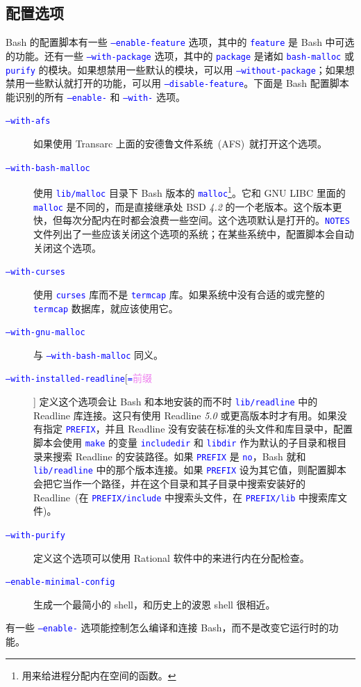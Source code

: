\documentclass[openany,notitlepage]{book}
\newcommand{\code}[1]{\textcolor{blue}{{\tt #1}}}
\newcommand{\hl}[1]{{\sl #1}}
\newcommand{\hs}[1]{{\textcolor{violet}{#1}}}
\begin{document}
\begin{CJK}{UTF8}{song}
\section{配置选项} %
Bash 的配置脚本有一些 \code{--enable-feature} 选项，其中的 \code{feature} 是 Bash 中可选的功能。还有一些 \code{--with-package} 选项，其中的 \code{package} 是诸如 \code{bash-malloc} 或 \code{purify} 的模块。如果想禁用一些默认的模块，可以用 \code{--without-package}；如果想禁用一些默认就打开的功能，可以用 \code{--disable-feature}。下面是 Bash 配置脚本能识别的所有 \code{--enable-} 和 \code{--with-} 选项。
\begin{description}
    \item[\code{--with-afs}] 如果使用 Transarc 上面的安德鲁文件系统~(AFS)~就打开这个选项。
    \item[\code{--with-bash-malloc}] 使用 \code{lib/malloc} 目录下 Bash 版本的 \code{malloc}\footnote{用来给进程分配内在空间的函数。}。它和 GNU LIBC 里面的 \code{malloc} 是不同的，而是直接继承处 BSD \hl{4.2} 的一个老版本。这个版本更快，但每次分配内在时都会浪费一些空间。这个选项默认是打开的。\code{NOTES} 文件列出了一些应该关闭这个选项的系统；在某些系统中，配置脚本会自动关闭这个选项。
    \item[\code{--with-curses}] 使用 \code{curses} 库而不是 \code{termcap} 库。如果系统中没有合适的或完整的 \code{termcap} 数据库，就应该使用它。
    \item[\code{--with-gnu-malloc}] 与 \code{--with-bash-malloc} 同义。
    \item[\code{--with-installed-readline}[\code{=}\hs{前缀}]] 定义这个选项会让 Bash 和本地安装的而不时 \code{lib/readline} 中的 Readline 库连接。这只有使用 Readline \hl{5.0} 或更高版本时才有用。如果没有指定 \code{PREFIX}，并且 Readline 没有安装在标准的头文件和库目录中，配置脚本会使用 \code{make} 的变量 \code{includedir} 和 \code{libdir} 作为默认的子目录和根目录来搜索 Readline 的安装路径。如果 \code{PREFIX} 是 \code{no}，Bash 就和 \code{lib/readline} 中的那个版本连接。如果 \code{PREFIX} 设为其它值，则配置脚本会把它当作一个路径，并在这个目录和其子目录中搜索安装好的 Readline~(在 \code{PREFIX/include} 中搜索头文件，在 \code{PREFIX/lib} 中搜索库文件)。
    \item[\code{--with-purify}] 定义这个选项可以使用 Rational 软件中的来进行内在分配检查。
    \item[\code{--enable-minimal-config}] 生成一个最简小的 shell，和历史上的波恩 shell 很相近。
\end{description}
有一些 \code{--enable-} 选项能控制怎么编译和连接 Bash，而不是改变它运行时的功能。

\end{CJK}
\end{document}
